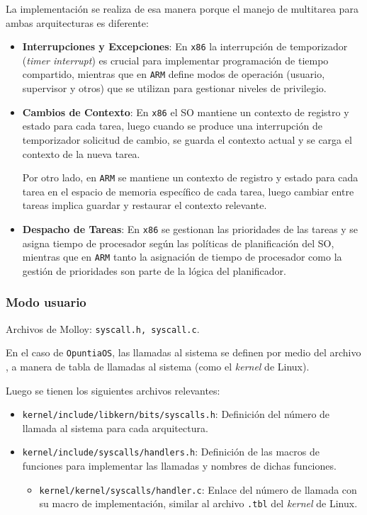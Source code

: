 		La implementación se realiza de esa manera porque el manejo de multitarea para ambas arquitecturas es diferente:
		\begin{itemize} \setlength\itemsep{0pt}
			\item \textbf{Interrupciones y Excepciones}: En \texttt{x86} la interrupción de temporizador (\textit{timer interrupt}) es crucial para implementar programación de tiempo compartido, mientras que en \texttt{ARM} define modos de operación (usuario, supervisor y otros) que se utilizan para gestionar niveles de privilegio.
			
			\item \textbf{Cambios de Contexto}: En \texttt{x86} el SO mantiene un contexto de registro y estado para cada tarea, luego cuando se produce una interrupción de temporizador solicitud de cambio, se guarda el contexto actual y se carga el contexto de la nueva tarea.
			
			Por otro lado, en \texttt{ARM} se mantiene un contexto de registro y estado para cada tarea en el espacio de memoria específico de cada tarea, luego cambiar entre tareas implica guardar y restaurar el contexto relevante.
			
			\item \textbf{Despacho de Tareas}: En \texttt{x86} se gestionan las prioridades de las tareas y se asigna tiempo de procesador según las políticas de planificación del SO, mientras que en \texttt{ARM} tanto la asignación de tiempo de procesador como la gestión de prioridades son parte de la lógica del planificador.
		\end{itemize}
	
	
	\subsubsection{Modo usuario}
		Archivos de Molloy: \texttt{syscall.h, syscall.c}.
		
		En el caso de \texttt{OpuntiaOS}, las llamadas al sistema se definen por medio del archivo \texttt{}, a manera de tabla de llamadas al sistema (como el \textit{kernel} de Linux).
		
		Luego se tienen los siguientes archivos relevantes:
		\begin{itemize} \setlength\itemsep{0pt}
			\item \texttt{kernel/include/libkern/bits/syscalls.h}: Definición del número de llamada al sistema para cada arquitectura.
			
			\item \texttt{kernel/include/syscalls/handlers.h}: Definición de las macros de funciones para implementar las llamadas y nombres de dichas funciones.
			
			\begin{itemize} \setlength\itemsep{0pt}
				\item \texttt{kernel/kernel/syscalls/handler.c}: Enlace del número de llamada con su macro de implementación, similar al archivo \texttt{.tbl} del \textit{kernel} de Linux.
			\end{itemize}
		\end{itemize}
	
